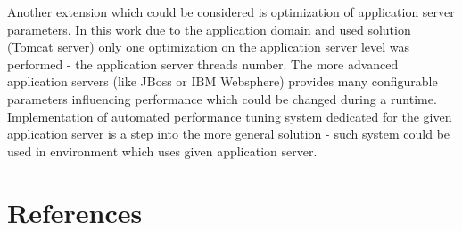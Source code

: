 \documentclass[10pt,a4paper]{article}
\begin{document}
Another extension which could be considered is optimization of application server parameters. In this work due to the application domain and used solution (Tomcat server) only one optimization on the application server level was performed - the application server threads number. The more advanced application servers (like JBoss or IBM Websphere) provides many configurable parameters influencing performance which could be changed during a runtime. Implementation of automated performance tuning system dedicated for the given application server is a step into the more general solution - such system could be used in environment which uses given application server.  

\pagebreak
\clearpage
\section{References} \label{section:references}
\renewcommand\refname{}
\end{document}
